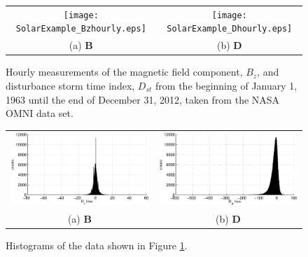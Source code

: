 \begin{figure}[ht]
\begin{tabular}{cc}
\texttt{[image: SolarExample\_Bzhourly.eps]} & \texttt{[image: SolarExample\_Dhourly.eps]} \\
(a) $\mathbf{B}$ & (b) $\mathbf{D}$
\end{tabular}
\caption{Hourly measurements of the magnetic field component, $B_z$, and disturbance storm time index, $D_{st}$ from the beginning of January 1, 1963 until the end of December 31, 2012, taken from the NASA OMNI data set.}
\label{fig:BzDstHOURLYxyplot}
\end{figure}

\begin{figure}[ht]
\begin{tabular}{cc}
\includegraphics[scale=0.48]{SolarExample_Bzhourlyhist.eps} & \includegraphics[scale=0.48]{SolarExample_Dhourlyhist.eps} \\
(a) $\mathbf{B}$ & (b) $\mathbf{D}$
\end{tabular}
\caption{Histograms of the data shown in Figure \ref{fig:BzDstHOURLYxyplot}.}
\label{fig:BzDstHOURLYxyhist}
\end{figure}

